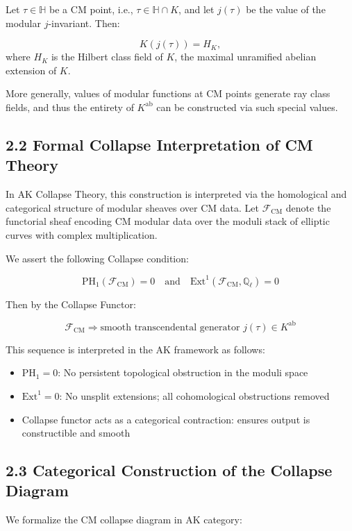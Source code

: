 \documentclass[11pt]{article}
\begin{document}
Let \( \tau \in \mathbb{H} \) be a CM point, i.e., \( \tau \in \mathbb{H} \cap K \), and let \( j(\tau) \) be the value of the modular \( j \)-invariant. Then:

\[
K(j(\tau)) = H_K,
\]
where \( H_K \) is the Hilbert class field of \( K \), the maximal unramified abelian extension of \( K \).

More generally, values of modular functions at CM points generate ray class fields, and thus the entirety of \( K^{\mathrm{ab}} \) can be constructed via such special values.

\subsection{2.2 Formal Collapse Interpretation of CM Theory}

In AK Collapse Theory, this construction is interpreted via the homological and categorical structure of modular sheaves over CM data. Let \( \mathcal{F}_{\mathrm{CM}} \) denote the functorial sheaf encoding CM modular data over the moduli stack of elliptic curves with complex multiplication.

We assert the following Collapse condition:

\[
\boxed{
\mathrm{PH}_1(\mathcal{F}_{\mathrm{CM}}) = 0 \quad \text{and} \quad \mathrm{Ext}^1(\mathcal{F}_{\mathrm{CM}}, \mathbb{Q}_\ell) = 0
}
\]

Then by the Collapse Functor:

\[
\mathcal{F}_{\mathrm{CM}} \Rightarrow \text{smooth transcendental generator } j(\tau) \in K^{\mathrm{ab}}
\]

This sequence is interpreted in the AK framework as follows:
\begin{itemize}
    \item \( \mathrm{PH}_1 = 0 \): No persistent topological obstruction in the moduli space
    \item \( \mathrm{Ext}^1 = 0 \): No unsplit extensions; all cohomological obstructions removed
    \item Collapse functor acts as a categorical contraction: ensures output is constructible and smooth
\end{itemize}

\subsection{2.3 Categorical Construction of the Collapse Diagram}

We formalize the CM collapse diagram in AK category:
\end{document}
